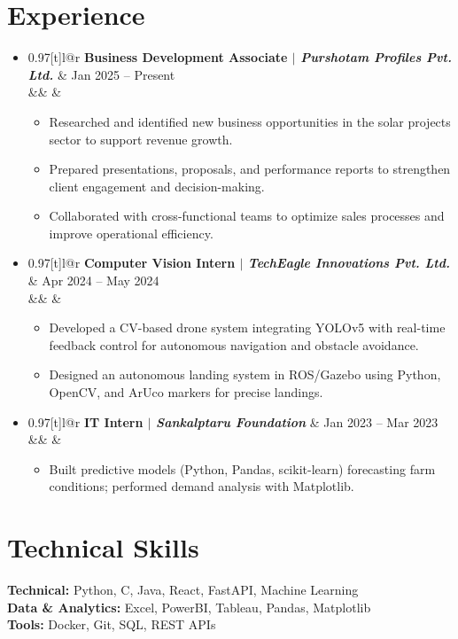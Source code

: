 \documentclass[letterpaper,11pt]{article}
\makeatletter
\newcommand{\resumeItem}[1]{
  \item\small{
    {#1 \vspace{-1pt}}
  }
}
\newcommand{\resumeSubheading}[4]{
  \vspace{-1pt}\item
    \begin{tabular*}{0.97\textwidth}[t]{l@{\extracolsep{\fill}}r}
      \textbf{#1} & #2 \\
      \ifx&#3&\else\textit{\small #3} & \textit{\small #4} \\\fi
    \end{tabular*}\vspace{-5pt}
}
\newcommand{\resumeSubHeadingListStart}{\begin{itemize}[leftmargin=0.15in, label={}]}
\newcommand{\resumeSubHeadingListEnd}{\end{itemize}\vspace{-5pt}}
\newcommand{\resumeItemListStart}{\begin{itemize}\vspace{-3pt}}
\newcommand{\resumeItemListEnd}{\end{itemize}\vspace{-2pt}}
\makeatother
\begin{document}
\section{Experience}
  \resumeSubHeadingListStart
    \resumeSubheading
      {Business Development Associate $|$ \textit{Purshotam Profiles Pvt. Ltd.}}{Jan 2025 -- Present}
      {}{}
      \resumeItemListStart
        \resumeItem{Researched and identified new business opportunities in the solar projects sector to support revenue growth.}
        \resumeItem{Prepared presentations, proposals, and performance reports to strengthen client engagement and decision-making.}
        \resumeItem{Collaborated with cross-functional teams to optimize sales processes and improve operational efficiency.}
      \resumeItemListEnd
    \resumeSubheading
      {Computer Vision Intern $|$ \textit{TechEagle Innovations Pvt. Ltd.}}{Apr 2024 -- May 2024}
      {}{}
      \resumeItemListStart
        \resumeItem{Developed a CV-based drone system integrating YOLOv5 with real-time feedback control for autonomous navigation and obstacle avoidance.}
        \resumeItem{Designed an autonomous landing system in ROS/Gazebo using Python, OpenCV, and ArUco markers for precise landings.}
      \resumeItemListEnd
    \resumeSubheading
      {IT Intern $|$ \textit{Sankalptaru Foundation}}{Jan 2023 -- Mar 2023}
      {}{}
      \resumeItemListStart
        \resumeItem{Built predictive models (Python, Pandas, scikit-learn) forecasting farm conditions; performed demand analysis with Matplotlib.}
      \resumeItemListEnd
  \resumeSubHeadingListEnd

\section{Technical Skills}
 \begin{itemize}[leftmargin=0.2in, label={}]
    \small{\item{
     \textbf{Technical:} Python, C, Java, React, FastAPI, Machine Learning \\
     \textbf{Data \& Analytics:} Excel, PowerBI, Tableau, Pandas, Matplotlib \\
     \textbf{Tools:} Docker, Git, SQL, REST APIs
    }}
 \end{itemize}
\end{document}

